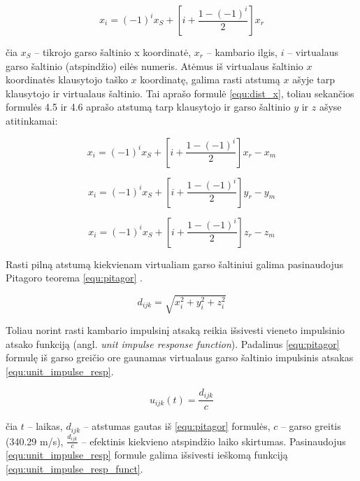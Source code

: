 \documentclass[]{vgtuef}
\begin{document}
{\begin{equation}
x_{i}=(-1)^{i}x_{S}+\left[ i+\frac{1-(-1)^{i}}{2}\right] x_{r}
\label{equ:virtual_sounds}
\end{equation}

čia $x_{S}$ – tikrojo garso šaltinio x koordinatė, $x_{r}$ – kambario ilgis, $i$ – virtualaus garso šaltinio (atspindžio) eilės numeris. Atėmus iš virtualaus šaltinio $x$ koordinatės klausytojo taško $x$ koordinatę, galima rasti atstumą $x$ ašyje tarp klausytojo ir virtualaus šaltinio. Tai aprašo formulė \ref{equ:dist_x}, toliau sekančios formulės 4.5 ir 4.6 aprašo atstumą tarp klausytojo ir garso šaltinio $y$ ir $z$ ašyse atitinkamai:

\begin{equation}
x_{i}=(-1)^{i}x_{S}+\left[ i+\frac{1-(-1)^{i}}{2}\right] x_{r}-x_{m}
\label{equ:dist_x}
\end{equation}

\begin{equation}
x_{i}=(-1)^{i}x_{S}+\left[ i+\frac{1-(-1)^{i}}{2}\right] y_{r}-y_{m}
\label{equ:dist_y}
\end{equation}

\begin{equation}
x_{i}=(-1)^{i}x_{S}+\left[ i+\frac{1-(-1)^{i}}{2}\right] z_{r}-z_{m}
\label{equ:dist_z}
\end{equation}

Rasti pilną atstumą kiekvienam virtualiam garso šaltiniui galima pasinaudojus Pitagoro teorema \ref{equ:pitagor} .

\begin{equation}
d_{ijk}=\sqrt{x_{i}^{2}+y_{i}^{2}+z_{i}^{2}}
\label{equ:pitagor}
\end{equation}

Toliau norint rasti kambario impulsinį atsaką reikia išsivesti vieneto impulsinio atsako funkciją  (angl. \textit{unit impulse response function}). Padalinus \ref{equ:pitagor} formulę iš garso greičio ore gaunamas virtualaus garso šaltinio impulsinis atsakas \ref{equ:unit_impulse_resp}.

\begin{equation}
u_{ijk}(t)=\frac{d_{ijk}}{c}
\label{equ:unit_impulse_resp}
\end{equation}

čia $t$ – laikas, $d_{ijk}$ – atstumas gautas iš \ref{equ:pitagor} formulės, $c$ – garso greitis (340.29 m/s), $\frac{d_{ijk}}{c}$ – efektinis kiekvieno atspindžio laiko skirtumas. Pasinaudojus \ref{equ:unit_impulse_resp} formule galima išsivesti ieškomą funkciją \ref{equ:unit_impulse_resp_funct}.

}
\end{document}
